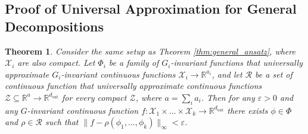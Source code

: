 \documentclass{article} \usepackage{iclr2023_conference,times}
\newcommand{\RR}{\mathbb R}
\newcommand{\mc}[1]{\mathcal{#1}}
\newcommand{\mrm}[1]{\mathrm{#1}}
\newcommand{\dout}{d_{\mrm{out}}}
\newtheorem{theorem}{Theorem}
\begin{document}
\subsection{Proof of Universal Approximation for General Decompositions}\label{appdx: Universal Approximation}



\begin{theorem}\label{thm:decomp_universal}
Consider the same setup as Theorem \ref{thm:general_ansatz}, where $\mc X_i$ are also compact.
Let $\Phi_i$ be a family of $G_i$-invariant functions that universally approximate $G_i$-invariant continuous functions $\mc X_i \rightarrow \mathbb{R}^{a_i}$, and let $\mc R$ be a set of continuous function that universally approximate continuous functions $\mc Z \subseteq \RR^{a}  \rightarrow \mathbb{R}^{\dout}$ for every compact $\mc Z$, where $a = \sum_i a_i$. Then for any $\varepsilon > 0$ and any $G$-invariant continuous function $f :\mc X_1 \times \ldots \times \mc X_k \to \RR^{\dout}$ there exists $\phi \in \Phi$ and $\rho \in \mc R$ such that $\|f - \rho(\phi_1, \ldots , \phi_k)\|_\infty < \varepsilon$.
\end{theorem}
\end{document}

